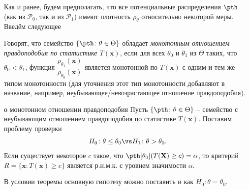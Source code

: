 Как и ранее, будем предполагать, что все потенциальные распределения $\pth$ (как из $\mathcal{P}_0$, так и из $\mathcal{P}_1$) имеют плотность $\rho_{\theta}$ относительно некоторой меры. Введём следующее

\begin{definition}
Говорят, что семейство $\{\pth\colon \theta \in \Theta\}$ обладает \textit{монотонным отношением правдоподобия по статистике $T(\mathbf{x})$}, если для всех $\theta_0$ и $\theta_1$ из $\Theta$ таких, что $\theta_0 < \theta_1$, функция $\dfrac{\rho_{\theta_1}(\mathbf{x})}{\rho_{\theta_0}(\mathbf{x})}$ является монотонной по $T(\mathbf{x})$ с одним и тем же типом монотонности (для уточнения этот тип монотонности добавляют в название, например, неубывающее/невозрастающее отношение правдоподобия).
\end{definition}

\begin{theorem}[label=mon_frac]{о монотонном отношении правдоподобия}{}
Пусть $\{\pth\colon \theta \in \Theta\}$ -- семейство с неубывающим отношением правдоподобия по статистике $T(\mathbf{x})$. Поставим проблему проверки
\[
H_0\colon \theta \le \theta_0 \vs H_1\colon \theta > \theta_0.
\]
Если существует некоторое $c$ такое, что $\pth[\theta_0](T(\mathbf X) \ge c) = \alpha$, то критерий $R = \{\mathbf{x}\colon T(\mathbf{x}) \ge c\}$ является р.н.м.к. с уровнем значимости $\alpha$.
\end{theorem}

\begin{remark}
В условии теоремы основную гипотезу можно поставить и как $H_0\colon \theta = \theta_0$.
\end{remark}

